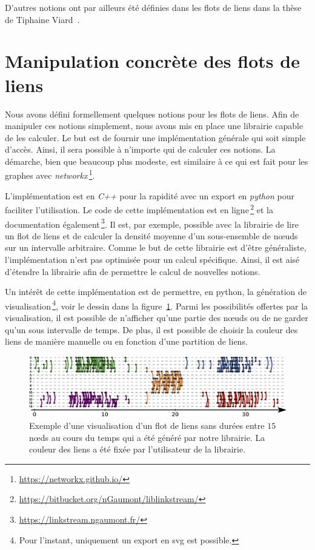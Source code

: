 \bigskip
D'autres notions ont par ailleurs été définies dans les flots de liens  dans la thèse de Tiphaine Viard~\cite{viard2016flots}.

\section{Manipulation concrète des flots de liens}

Nous avons défini formellement quelques notions pour les flots de liens.
Afin de manipuler ces notions simplement, nous avons mis en place une librairie capable de les calculer.
Le but est de fournir une implémentation générale qui soit simple d'accès.
Ainsi, il sera possible à n'importe qui de calculer ces notions.
La démarche, bien que beaucoup plus modeste, est similaire à ce qui est fait pour les graphes avec \emph{networkx}\,\footnote{\url{https://networkx.github.io/}}.

L'implémentation est en \emph{C++} pour la rapidité avec un export en \emph{python} pour faciliter l'utilisation.
Le code de cette implémentation est en ligne\,\footnote{\url{https://bitbucket.org/nGaumont/liblinkstream/}} et la documentation également\,\footnote{\url{https://linkstream.ngaumont.fr/}}.
Il est, par exemple, possible avec la librairie de lire un flot de liens et de calculer la densité moyenne d'un sous-ensemble de n\oe{}uds sur un intervalle arbitraire.
Comme le but de cette librairie est d'être généraliste, l'implémentation n'est pas optimisée pour un calcul spécifique.
Ainsi, il est aisé d'étendre la librairie afin de permettre le calcul de nouvelles notions.
 

Un intérêt de cette implémentation est de permettre, en python, la génération de visualisation\,\footnote{Pour  l'instant, uniquement un export en svg est possible.}, voir le dessin dans la figure~\ref{fig:exemple_Flot_de_liens_lib}.
Parmi les possibilités offertes par la visualisation, il est possible de n'afficher qu'une partie des n\oe{}uds ou de ne garder qu'un sous intervalle de temps.
De plus, il est possible de choisir la couleur des liens de manière manuelle ou en fonction d'une partition de liens.

\begin{figure}
\centering
\includegraphics[width=\linewidth]{img/Intro/Dessin_Flot.eps}
\caption{Exemple d'une visualisation d'un flot de liens sans durées entre $15$ n\oe{}ds au cours du temps qui a été généré par notre librairie.
La couleur des liens a été fixée par l'utilisateur de la librairie.
}
\label{fig:exemple_Flot_de_liens_lib}
\end{figure}

